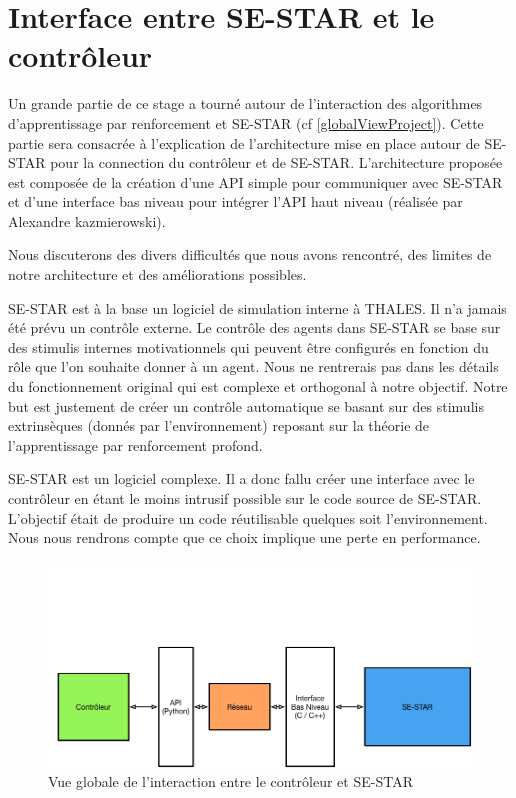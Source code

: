 
\section{Interface entre SE-STAR et le contrôleur}

Un grande partie de ce stage a tourné autour de l'interaction des algorithmes d'apprentissage par renforcement et SE-STAR (cf \ref{globalViewProject}). Cette partie sera consacrée à l'explication de l'architecture mise en place autour de SE-STAR pour la connection du contrôleur et de SE-STAR.
L'architecture proposée est composée de la création d'une \gls{API} simple pour communiquer avec SE-STAR et d'une interface bas niveau pour intégrer l'\gls{API} haut niveau (réalisée par Alexandre  kazmierowski).

Nous discuterons des divers difficultés que nous avons rencontré, des limites de notre architecture et des améliorations possibles.


SE-STAR est à la base un logiciel de simulation interne à THALES. Il n'a jamais été prévu un contrôle externe. Le contrôle des agents dans SE-STAR se base sur des stimulis internes motivationnels qui peuvent être configurés en fonction du rôle que l'on souhaite donner à un agent. Nous ne rentrerais pas dans les détails du fonctionnement original qui est complexe et orthogonal à notre objectif. Notre but est justement de créer un contrôle automatique se basant sur des stimulis extrinsèques (donnés par l'environnement) reposant sur la théorie de l'apprentissage par renforcement profond.

SE-STAR est un logiciel complexe. Il a donc fallu créer une interface  avec le contrôleur en étant le moins intrusif possible sur le code source de SE-STAR. L'objectif était de produire un code réutilisable quelques soit l'environnement. Nous nous rendrons compte que ce choix implique une perte en performance.

\begin{figure}[!h]
\centering
\includegraphics[width=.9\linewidth]{./assets/interfaceReseau/overviewInterface}
\caption{Vue globale de l'interaction entre le contrôleur et SE-STAR}
\end{figure}

